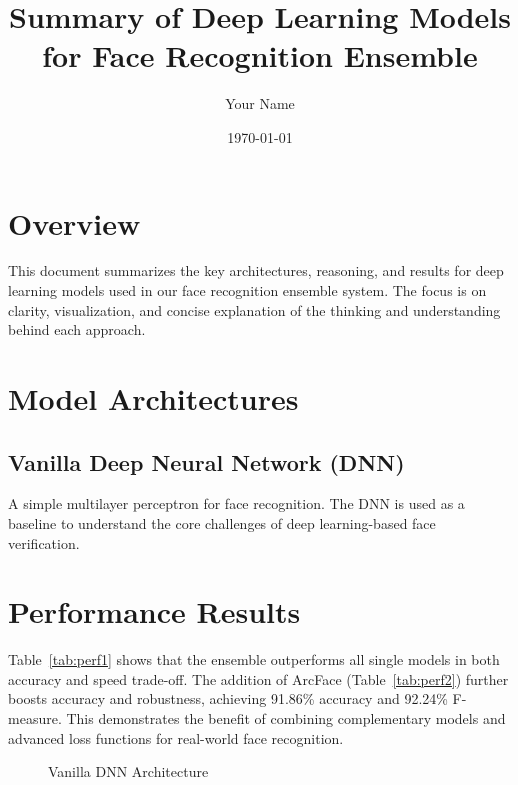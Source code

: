 \documentclass[11pt]{article}
\title{Summary of Deep Learning Models for Face Recognition Ensemble}
\author{Your Name}
\date{\today}
\begin{document}
\maketitle

\section{Overview}
This document summarizes the key architectures, reasoning, and results for deep learning models used in our face recognition ensemble system. The focus is on clarity, visualization, and concise explanation of the thinking and understanding behind each approach.

\section{Model Architectures}

\subsection{Vanilla Deep Neural Network (DNN)}
A simple multilayer perceptron for face recognition. The DNN is used as a baseline to understand the core challenges of deep learning-based face verification.

\section{Performance Results}

Table~\ref{tab:perf1} shows that the ensemble outperforms all single models in both accuracy and speed trade-off. The addition of ArcFace (Table~\ref{tab:perf2}) further boosts accuracy and robustness, achieving 91.86\% accuracy and 92.24\% F-measure. This demonstrates the benefit of combining complementary models and advanced loss functions for real-world face recognition.

\begin{figure}[htbp]
\centering
{}
\caption{Vanilla DNN Architecture}
\end{figure}
\end{document}

